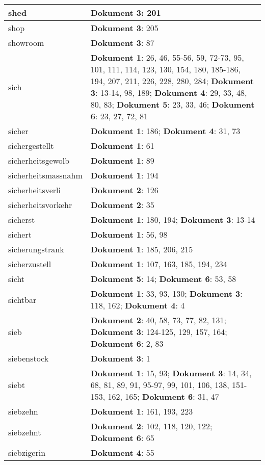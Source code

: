 \documentclass[a5paper]{article}
\begin{document}
\begin{longtable}[l]{|l|p{3in}|}
\hline
shed & \textbf{Dokument 3}: 201 \\
\hline
shop & \textbf{Dokument 3}: 205 \\
\hline
showroom & \textbf{Dokument 3}: 87 \\
\hline
sich & \textbf{Dokument 1}: 26, 46, 55-56, 59, 72-73, 95, 101, 111, 114, 123, 130, 154, 180, 185-186, 194, 207, 211, 226, 228, 280, 284; \textbf{Dokument 3}: 13-14, 98, 189; \textbf{Dokument 4}: 29, 33, 48, 80, 83; \textbf{Dokument 5}: 23, 33, 46; \textbf{Dokument 6}: 23, 27, 72, 81 \\
\hline
sicher & \textbf{Dokument 1}: 186; \textbf{Dokument 4}: 31, 73 \\
\hline
sichergestellt & \textbf{Dokument 1}: 61 \\
\hline
sicherheitsgewolb & \textbf{Dokument 1}: 89 \\
\hline
sicherheitsmassnahm & \textbf{Dokument 1}: 194 \\
\hline
sicherheitsverli & \textbf{Dokument 2}: 126 \\
\hline
sicherheitsvorkehr & \textbf{Dokument 2}: 35 \\
\hline
sicherst & \textbf{Dokument 1}: 180, 194; \textbf{Dokument 3}: 13-14 \\
\hline
sichert & \textbf{Dokument 1}: 56, 98 \\
\hline
sicherungstrank & \textbf{Dokument 1}: 185, 206, 215 \\
\hline
sicherzustell & \textbf{Dokument 1}: 107, 163, 185, 194, 234 \\
\hline
sicht & \textbf{Dokument 5}: 14; \textbf{Dokument 6}: 53, 58 \\
\hline
sichtbar & \textbf{Dokument 1}: 33, 93, 130; \textbf{Dokument 3}: 118, 162; \textbf{Dokument 4}: 4 \\
\hline
sieb & \textbf{Dokument 2}: 40, 58, 73, 77, 82, 131; \textbf{Dokument 3}: 124-125, 129, 157, 164; \textbf{Dokument 6}: 2, 83 \\
\hline
siebenstock & \textbf{Dokument 3}: 1 \\
\hline
siebt & \textbf{Dokument 1}: 15, 93; \textbf{Dokument 3}: 14, 34, 68, 81, 89, 91, 95-97, 99, 101, 106, 138, 151-153, 162, 165; \textbf{Dokument 6}: 31, 47 \\
\hline
siebzehn & \textbf{Dokument 1}: 161, 193, 223 \\
\hline
siebzehnt & \textbf{Dokument 2}: 102, 118, 120, 122; \textbf{Dokument 6}: 65 \\
\hline
siebzigerin & \textbf{Dokument 4}: 55 \\

\end{longtable}
\end{document}
